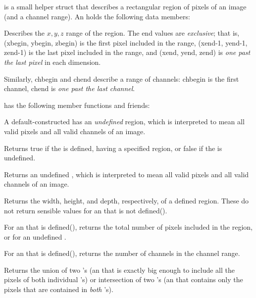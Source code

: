 \ROI is a small helper struct that describes a rectangular region of
pixels of an image (and a channel range).  An \ROI holds the following
data members:

Describes the $x, y, z$ range of the region.  The {\cf end} values are
\emph{exclusive}; that is, ({\cf xbegin, ybegin, zbegin}) is the first
pixel included in the range, ({\cf xend-1, yend-1, zend-1}) is the last
pixel included in the range, and ({\cf xend, yend, zend}) is \emph{one
past the last pixel} in each dimension.

Similarly, {\cf chbegin} and {\cf chend} describe a range of channels:
{\cf chbegin} is the first channel, {\cf chend} is \emph{one past the last
channel}.
\apiend

\smallskip

\noindent \ROI has the following member functions and friends:

\smallskip

A default-constructed \ROI has an \emph{undefined} region, which
is interpreted to mean all valid pixels and all valid channels of
an image.
\apiend

Returns {\cf true} if the \ROI is defined, having a specified region,
or {\cf false} if the \ROI is undefined.
\apiend

Returns an undefined \ROI, which is interpreted to mean all valid pixels
and all valid channels of an image.
\apiend

Returns the width, height, and depth, respectively, of a defined region.
These do not return sensible values for an \ROI that is not {\cf defined()}.
\apiend

For an \ROI that is {\cf defined()}, returns the total number of pixels
included in the region, or {} for an undefined \ROI.
\apiend

For an \ROI that is {\cf defined()}, returns the number of channels
in the channel range.
\apiend

Returns the union of two \ROI's (an \ROI that is exactly big enough
to include all the pixels of both individual \ROI's) or intersection
of two \ROI's (an \ROI that contains only the pixels that are contained
in \emph{both} \ROI's).
\apiend

